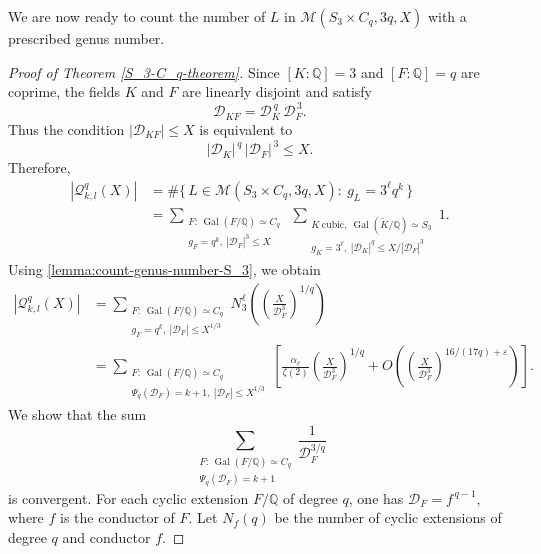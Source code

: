 \documentclass[11pt,reqno]{amsart}
\newcommand{\cM}{\mathcal{M}}
\newcommand{\cQ}{\mathcal{Q}}
\DeclareMathOperator{\Gal}{Gal}
\theoremstyle{definition}
\theoremstyle{remark}
\begin{document}
We are now ready to count the number of $L$ in $\cM(S_3\times C_q, 3q, X)$ with a prescribed genus number.
\begin{proof}[Proof of Theorem \ref{S_3-C_q-theorem}]
Since $[K:\mathbb{Q}]=3$ and $[F:\mathbb{Q}]=q$ are coprime, the fields $K$ and
$F$ are linearly disjoint and satisfy
\[
    \mathcal{D}_{KF}
    = \mathcal{D}_{K}^{\,q}\, \mathcal{D}_{F}^{\,3}.
\]
Thus the condition $|\mathcal{D}_{KF}|\le X$ is equivalent to
\[
    |\mathcal{D}_K|^{\,q}\,|\mathcal{D}_F|^{\,3} \le X.
\]
Therefore,
\begin{align*}
    |\cQ^q_{k,l}(X)|
    &= 
    \#\bigl\{\, L \in \cM(S_3\times C_q, 3q, X) : \ g_L = 3^{\ell}q^{k} \,\bigr\} \\
    &=
    \sum_{\substack{
        F:\, \Gal(F/\mathbb{Q})\simeq C_q\\
        g_F = q^{k},\ |\mathcal{D}_F|^{3}\le X}}
    \
    \sum_{\substack{
        K\ \text{cubic},\ \Gal(\widetilde{K}/\mathbb{Q})\simeq S_3\\
        g_K = 3^{\ell},\ |\mathcal{D}_K|^{q}\le X/|\mathcal{D}_F|^{3}}}
    1.
\end{align*}
Using \eqref{lemma:count-genus-number-S_3}, we obtain
\begin{align}\label{eqn-a-1}
    |\cQ^q_{k,l}(X)|
    &= 
    \sum_{\substack{
        F:\, \Gal(F/\mathbb{Q})\simeq C_q\\
        g_F = q^{k},\ |\mathcal{D}_F|\le X^{1/3}}}
    N_3^{\ell}\!\left( \left(\frac{X}{\mathcal{D}_F^3}\right)^{1/q} \right) \nonumber\\[6pt]
    &=
    \sum_{\substack{
        F:\, \Gal(F/\mathbb{Q})\simeq C_q\\
        \Psi_q(\mathcal{D}_F)=k+1,\ |\mathcal{D}_F|\le X^{1/3}}}
    \left[
        \frac{\alpha_\ell}{\zeta(2)}
        \left(\frac{X}{\mathcal{D}_F^3}\right)^{1/q}
        + O\!\left(
            \left(\frac{X}{\mathcal{D}_F^3}\right)^{16/(17q)+\varepsilon}
        \right)
    \right].
\end{align}
We show that the sum
\begin{equation}\label{eqn-sum}
    \sum_{\substack{
        F:\, \Gal(F/\mathbb{Q})\simeq C_q\\
        \Psi_q(\mathcal{D}_F)=k+1}}
    \frac{1}{\mathcal{D}_F^{3/q}}
\end{equation}
is convergent. For each cyclic extension $F/\mathbb{Q}$ of degree $q$, one has
$\mathcal{D}_F = f^{\,q-1}$, where $f$ is the conductor of $F$. Let $N_f(q)$ be the number of cyclic extensions of degree $q$ and conductor $f$.

\end{proof}
\end{document}
